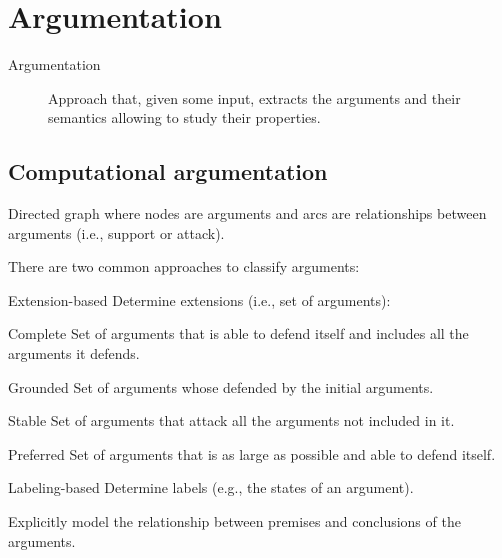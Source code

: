 \section{Argumentation}

\begin{description}
    \item[Argumentation] 
        Approach that, given some input, extracts the arguments and their semantics allowing to study their properties.
\end{description}


\subsection{Computational argumentation}

\begin{description}
    \item[Abstract argumentation] 
        Directed graph where nodes are arguments and arcs are relationships between arguments (i.e., support or attack).

        There are two common approaches to classify arguments:
        \begin{descriptionlist}
            \item[Extension-based] 
                Determine extensions (i.e., set of arguments):
                \begin{descriptionlist}
                    \item[Complete] Set of arguments that is able to defend itself and includes all the arguments it defends. 
                    \item[Grounded] Set of arguments whose defended by the initial arguments.
                    \item[Stable] Set of arguments that attack all the arguments not included in it.
                    \item[Preferred] Set of arguments that is as large as possible and able to defend itself.
                \end{descriptionlist}
            \item[Labeling-based] 
                Determine labels (e.g., the states of an argument).
        \end{descriptionlist}

    \item[Structured argumentation] 
        Explicitly model the relationship between premises and conclusions of the arguments.
\end{description}


